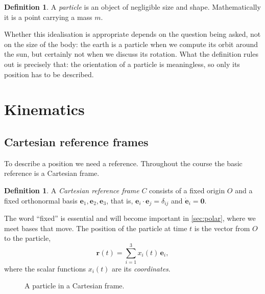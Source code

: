 \documentclass[11pt,a4paper,oneside]{report}
\numberwithin{equation}{chapter}
\newcommand{\vect}[1]{\bm{#1}}
\newcommand{\e}[1]{\vect{e}_{#1}}
\theoremstyle{plain}
\theoremstyle{definition}
\newtheorem{definition}[theorem]{Definition}
\theoremstyle{remark}
\begin{document}
\begin{definition}
A \emph{particle} is an object of negligible size and shape. Mathematically it is a point carrying a mass $m$.
\end{definition}

Whether this idealisation is appropriate depends on the question being asked, not on the size of the body:
the earth is a particle when we compute its orbit around the sun, but certainly not when we discuss its
rotation. What the definition rules out is precisely that: the orientation of a particle is meaningless, so only
its position has to be described.

\section{Kinematics}\label{sec:kinematics}

\subsection{Cartesian reference frames}

To describe a position we need a reference. Throughout the course the basic reference is a Cartesian frame.

\begin{definition}
A \emph{Cartesian reference frame} $C$ consists of a fixed origin $O$ and a fixed orthonormal basis
$\e1,\e2,\e3$, that is, $\e i\cdot\e j=\delta_{ij}$ and $\dot{\vect e}_i=\vect 0$.
\end{definition}

The word ``fixed'' is essential and will become important in \cref{sec:polar}, where we meet bases that move.
The position of the particle at time $t$ is the vector from $O$ to the particle,
\begin{equation}\label{eq:position}
  \vect r(t)=\sum_{i=1}^{3}x_i(t)\,\e i ,
\end{equation}
where the scalar functions $x_i(t)$ are its \emph{coordinates}.

\begin{figure}[ht]
\centering
{}
\caption{A particle in a Cartesian frame.}
\end{figure}
\end{document}
